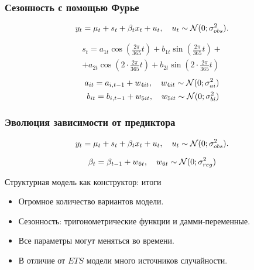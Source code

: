   
  \begin{frame}
    \frametitle{Сезонность с помощью Фурье}
    \[
    y_t = \mu_t + s_t + \beta_t x_t +  u_t, \quad u_t \sim \mathcal{N}(0; \sigma^2_{obs}).  
    \]
  
    \pause
    \begin{eqnarray*}
       s_t = a_{1t} \cos(\frac{2\pi}{365} t) + b_{1t} \sin(\frac{2\pi}{365} t) + \\
           + a_{2t} \cos(2\cdot \frac{2\pi}{365} t) + b_{2t} \sin(2\cdot\frac{2\pi}{365} t)
    \end{eqnarray*}
    \pause
    \begin{eqnarray*}
      a_{it} = a_{i,t-1} + w_{4it}, \quad w_{4it} \sim \mathcal{N}(0;\sigma^2_{ai}) \\
      b_{it} = b_{i,t-1} + w_{5it}, \quad w_{5it} \sim \mathcal{N}(0;\sigma^2_{bi})
    \end{eqnarray*}
    
  \end{frame}
  
  \begin{frame}
    \frametitle{Эволюция зависимости от предиктора}
    \[
    y_t = \mu_t + s_t + \beta_t x_t +  u_t, \quad u_t \sim \mathcal{N}(0; \sigma^2_{obs}).  
    \]
  
    \pause
    \[
       \beta_{t} = \beta_{t-1} + w_{6t}, \quad  w_{6t} \sim \mathcal{N}(0;\sigma^2_{reg})
    \]
    
  \end{frame}
  
  

  \begin{frame}{Структурная модель как конструктор: итоги}

    \begin{itemize}[<+->]
      \item Огромное количество \alert{вариантов модели}.
    \item Сезонность: \alert{тригонометрические функции} и \alert{дамми-переменные}.
      \item Все параметры могут \alert{меняться} во времени.
      \item В отличие от $ETS$ модели \alert{много источников} случайности. 
    \end{itemize}
  \end{frame}
  